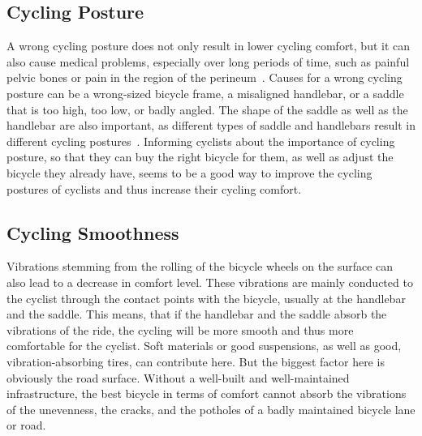 \subsection*{Cycling Posture}
A wrong cycling posture does not only result in lower cycling comfort, but it can also cause medical problems, especially over long periods of time, such as painful pelvic bones or pain in the region of the
perineum~\cite{christiaans1998comfort}.
Causes for a wrong cycling posture can be a wrong-sized bicycle frame, a misaligned handlebar, or a saddle that is too high, too low, or badly angled.
The shape of the saddle as well as the handlebar are also important, as different types of saddle and handlebars result in different cycling postures~\cite{bressel2003bicycle}.
Informing cyclists about the importance of cycling posture, so that they can buy the right bicycle for them, as well as adjust the bicycle they already have, seems to be a good way to improve the cycling postures of cyclists and thus increase their cycling comfort.

\subsection*{Cycling Smoothness}
Vibrations stemming from the rolling of the bicycle wheels on the surface can also lead to a decrease in comfort level.
These vibrations are mainly conducted to the cyclist through the contact points with the bicycle, usually at the handlebar and the saddle.
This means, that if the handlebar and the saddle absorb the vibrations of the ride, the cycling will be more smooth and thus more comfortable for the cyclist.
Soft materials or good suspensions, as well as good, vibration-absorbing tires, can contribute here.
But the biggest factor here is obviously the road surface.
Without a well-built and well-maintained infrastructure, the best bicycle in terms of comfort cannot absorb the vibrations of the unevenness, the cracks, and the potholes of a badly maintained bicycle lane or road.

